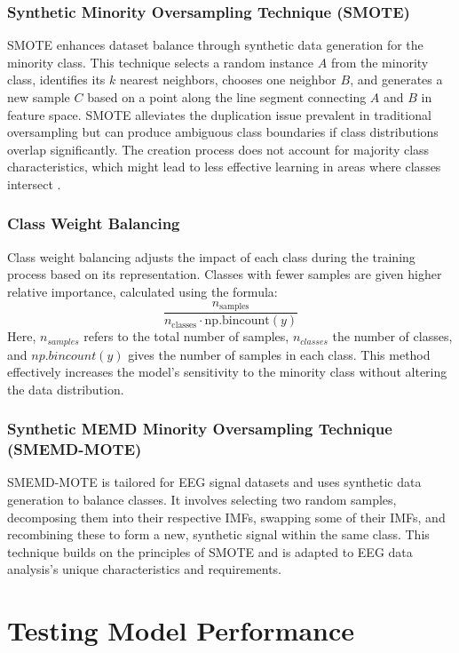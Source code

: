 \subsubsection{Synthetic Minority Oversampling Technique (SMOTE)}
SMOTE enhances dataset balance through synthetic data generation for the minority class. This technique selects a random instance \(A\) from the minority class, identifies its \(k\) nearest neighbors, chooses one neighbor \(B\), and generates a new sample \(C\) based on a point along the line segment connecting \(A\) and \(B\) in feature space. SMOTE alleviates the duplication issue prevalent in traditional oversampling but can produce ambiguous class boundaries if class distributions overlap significantly. The creation process does not account for majority class characteristics, which might lead to less effective learning in areas where classes intersect \cite{smote}.

\subsubsection{Class Weight Balancing}
Class weight balancing adjusts the impact of each class during the training process based on its representation. Classes with fewer samples are given higher relative importance, calculated using the formula: 
\[
\frac{n_{\text{samples}}}{n_{\text{classes}} \cdot \text{np.bincount}(y)}
\]
Here, \(n_{samples}\) refers to the total number of samples, \(n_{classes}\) the number of classes, and \(np.bincount(y)\) gives the number of samples in each class.
This method effectively increases the model's sensitivity to the minority class without altering the data distribution.

\subsubsection{Synthetic MEMD Minority Oversampling Technique (SMEMD-MOTE)}
SMEMD-MOTE is tailored for EEG signal datasets and uses synthetic data generation to balance classes. It involves selecting two random samples, decomposing them into their respective IMFs, swapping some of their IMFs, and recombining these to form a new, synthetic signal within the same class. This technique builds on the principles of SMOTE and is adapted to EEG data analysis's unique characteristics and requirements.


\section{Testing Model Performance}
\label{performanceMetrics}

